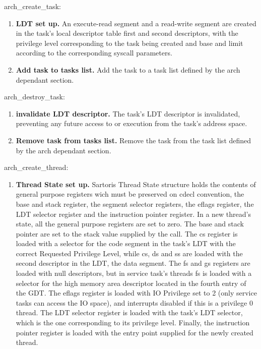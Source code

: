 \documentclass[11pt, letterpaper, twoside, english]{book}
\begin{document}
\textsf{arch\_create\_task}: 
\begin{enumerate}
\item[]\textbf{LDT set up.} An execute-read segment and a read-write segment are created in the task's local descriptor table first and second descriptors, with the privilege level corresponding to the task being created and base and limit according to the corresponding syscall parameters.
\item[]\textbf{Add task to tasks list.} Add the task to a task list defined by the arch dependant section.
\end{enumerate}

\textsf{arch\_destroy\_task}: 
\begin{enumerate}
\item[]\textbf{invalidate LDT descriptor.} The task's LDT descriptor is invalidated, preventing any future access to or execution from the task's address space.
\item[]\textbf{Remove task from tasks list.} Remove the task from the task list defined by the arch dependant section.
\end{enumerate}

\textsf{arch\_create\_thread}: 
\begin{enumerate}
\item[]\textbf{Thread State set up.} Sartoris Thread State structure holds the contents of general purpose registers wich must be preserved on cdecl convention, the base and stack register, the segment selector registers, the eflags register, the LDT selector register and the instruction pointer register. In a new thread's state, all the general purpose registers are set to zero. The base and stack pointer are set to the stack value supplied by the call. The cs register is loaded with a selector for the code segment in the task's LDT with the correct Requested Privilege Level, while cs, ds and ss are loaded with the second descriptor in the LDT, the data segment. The fs and gs registers are loaded with null descriptors, but in service task's threads fs is loaded with a selector for the high memory area descriptor located in the fourth entry of the GDT. The eflags register is loaded with IO Privilege set to 2 (only service tasks can access the IO space), and interrupts disabled if this is a privilege 0 thread. The LDT selector register is loaded with the task's LDT selector, which is the one corresponding to its privilege level. Finally, the instruction pointer register is loaded with the entry point supplied for the newly created thread.
\end{enumerate}
\end{document}
